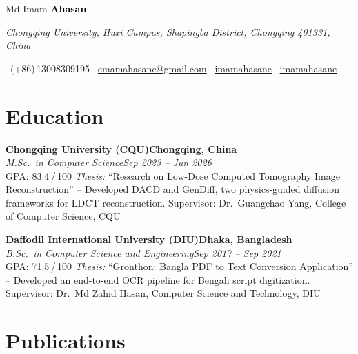 \documentclass[11pt,a4paper]{article}
\newcommand{\EntryHeadingTwo}[4]{%
  \textbf{#1}\hfill \textbf{#2}\\
  \textit{#3}\hfill \textit{#4}\\
}
\begin{document}
\begin{center}
  {\fontsize{34}{38}\selectfont\sffamily
    \textcolor{NameGray}{Md Imam }\textbf{\textcolor{black}{Ahasan}}
  }\par
  \vspace{2pt}
  {\small\itshape\color{SoftGray}
    Chongqing University, Huxi Campus, Shapingba District, Chongqing 401331, China
  }\par
  \vspace{2pt}
  {\small\sffamily\color{SoftGray}
    \faPhone\ (+86)\,13008309195 \enspace\textbar\enspace
    \faEnvelope\ \href{mailto:emamahasane@gmail.com}{emamahasane@gmail.com} \enspace\textbar\enspace
    \faGithub\ \href{https://github.com/imamahasane}{imamahasane} \enspace\textbar\enspace
    \faLinkedin\ \href{https://www.linkedin.com/in/imamahasane}{imamahasane}
  }\par
\end{center}

\section*{Education}

\EntryHeadingTwo
  {Chongqing University (CQU)}{Chongqing, China}
  {M.Sc.\ in Computer Science}{Sep 2023 -- Jun 2026}
{\small GPA: 83.4\,/\,100}\newline
{\small\textit{Thesis:} ``Research on Low-Dose Computed Tomography Image Reconstruction'' -- Developed DACD and GenDiff, two physics-guided diffusion frameworks for LDCT reconstruction. Supervisor: Dr.\ Guangchao Yang, College of Computer Science, CQU}

\vspace{3pt}

\EntryHeadingTwo
  {Daffodil International University (DIU)}{Dhaka, Bangladesh}
  {B.Sc.\ in Computer Science and Engineering}{Sep 2017 -- Sep 2021}
{\small GPA: 71.5\,/\,100}\newline
{\small\textit{Thesis:} ``Gronthon: Bangla PDF to Text Conversion Application'' -- Developed an end-to-end OCR pipeline for Bengali script digitization. Supervisor: Dr.\ Md Zahid Hasan, Computer Science and Technology, DIU}

\section*{Publications}
\end{document}

